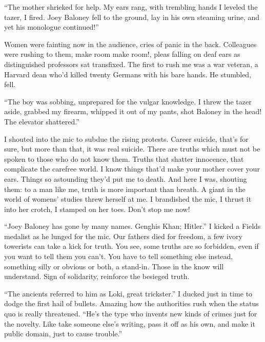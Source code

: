\documentclass[oneside]{book}
\begin{document}
``The mother shrieked for help.  My ears rang, with trembling hands I leveled the tazer, I fired.
Joey Baloney fell to the ground, lay in his own steaming urine, and yet his monologue continued!''

Women were fainting now in the audience, cries of panic in the back.
Colleagues were rushing to them, make room make room!, pleas falling on deaf ears
as distinguished professors sat transfixed.
The first to rush me was a war veteran, a Harvard dean who'd
killed twenty Germans with his bare hands.
He stumbled, fell.

``The boy was sobbing, unprepared for the vulgar knowledge.
I threw the tazer aside, grabbed my firearm, whipped it out of my pants,
shot Baloney in the head!  The elevator shattered.''

I shouted into the mic to subdue the rising protests.
Career suicide, that's for sure, but more than that, it was real suicide.
There are truths which must not be spoken to those who do not know them.
Truths that shatter innocence, that complicate the carefree world.
I know things that'd make your mother cover your ears.
Things so astounding they'd put me to death.
And here I was, shouting them: to a man like me, truth
is more important than breath.
A giant in the world of womens' studies threw herself at me.
I brandished the mic, I thrust it into her crotch, I stamped on her toes.
Don't stop me now!

``Joey Baloney has gone by many names.  Genghis Khan; Hitler.''
I kicked a Fields medalist as he lunged for the mic.  Our fathers
died for freedom, a few ivory towerists can take a kick for truth.
You see, some truths are so forbidden, even if you want to tell them
you can't.  You have to tell something else instead, something silly or obvious or both,
a stand-in.  Those in the know will understand.
Sign of solidarity, reinforce the besieged truth.

``The ancients referred to him as Loki, great trickster.''
I ducked just in time to dodge the first hail of bullets.
Amazing how the authorities rush when the status quo is
really threatened.
``He's the type who invents new kinds of crimes just for the novelty.
Like take someone else's writing, pass it off as his own, and make
it public domain, just to cause trouble.''
\end{document}
